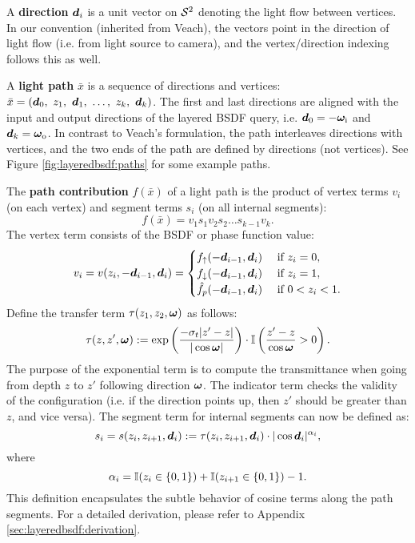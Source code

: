 A {\bf direction} $\bm{d}_i$ is a unit vector on $\mathcal{S}^2$ denoting the light flow between vertices. In our convention (inherited from Veach), 
the vectors point in the direction of light flow (i.e. from light source to camera), and the vertex/direction indexing follows this as well.

A {\bf light path} $\bar x$ is a sequence of directions and vertices: $\bar x = (\bmd_0,\ z_1,\ \bmd_1,\ \dots,\ z_k,\ \bmd_k)$.
The first and last directions are aligned with the input and output directions of the layered BSDF query, i.e. $\bm{d}_0 = -\bm\omega_\mathrm{i}$ and $\bm{d}_k = \bm\omega_\mathrm{o}$. In contrast to Veach's formulation, the path interleaves directions with vertices, and the two ends of the path are defined by directions (not vertices). See Figure \ref{fig:layeredbsdf:paths} for some example paths.



The {\bf path contribution} $f(\bar x)$ of a light path is the product of vertex terms $v_i$ (on each vertex) and segment terms $s_i$ (on all internal segments):
\begin{equation}
	f(\bar x) = v_1 s_1 v_2 s_2 \dots s_{k-1} v_k.
\end{equation}
The vertex term consists of the BSDF or phase function value:
\begin{equation}
\label{eqn:vtx_contrib}
v_i = v(z_i, -\bm{d}_{i - 1}, \bm{d}_i)
= \begin{cases}
	f_\uparrow(-\bm{d}_{i-1}, \bm{d}_i)   & \mbox{  if  } z_i = 0,\\
	f_\downarrow(-\bm{d}_{i-1}, \bm{d}_i) & \mbox{  if  } z_i = 1,\\
  	\hat{f}_p(-\bm{d}_{i-1}, \bm{d}_i)    & \mbox{  if  } 0 < z_i < 1.
\end{cases}
\end{equation}
Define the transfer term $\tau(z_1, z_2, \bm\omega)$ as follows:
\begin{equation}
\tau(z, z', \bm\omega) := \exp \left( \frac{-\sigma_t |z' - z|}{|\cos \bm\omega|} \right) \cdot \mathbb{I} \left( \frac{z' - z}{\cos \bm\omega} > 0 \right).
\end{equation}
The purpose of the exponential term is to compute the transmittance when going from depth $z$ to $z'$ following direction $\bm\omega$.
The indicator term checks the validity of the configuration (i.e. if the direction points up, then $z'$ should be greater than $z$, and vice versa). The segment term for internal segments can now be defined as:
\begin{equation}
\label{eqn:seg_contrib}
s_i = s(z_i, z_{i + 1}, \bm{d}_i) := \tau(z_i, z_{i+1}, \bm{d}_i) \cdot |\cos \bm{d}_i|^{\alpha_i},
\end{equation}
where
\begin{equation}
\label{eqn:seg_contrib_cosine}
\alpha_i = \mathbb{I}(z_i \in \{0,1\}) + \mathbb{I}(z_{i + 1} \in \{0,1\}) - 1.
\end{equation}
This definition encapsulates the subtle behavior of cosine terms along the path segments.
For a detailed derivation, please refer to Appendix \ref{sec:layeredbsdf:derivation}.

